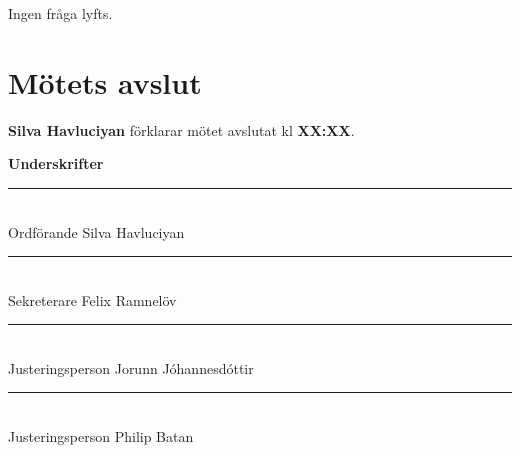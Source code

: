 \documentclass{datateknologsektionen-document}
\begin{document}
Ingen fråga lyfts.


\section{Mötets avslut}


\textbf{Silva Havluciyan} förklarar mötet avslutat kl \textbf{XX:XX}.




\pagebreak
{\Large\bfseries Underskrifter}

\vspace*{1.2cm}
\noindent\rule{8cm}{1pt}\\
Ordförande Silva Havluciyan

\vspace*{1.2cm}
\noindent\rule{8cm}{1pt}\\
Sekreterare Felix Ramnelöv

\vspace*{1.2cm}
\noindent\rule{8cm}{1pt}\\
Justeringsperson Jorunn Jóhannesdóttir

\vspace*{1.2cm}
\noindent\rule{8cm}{1pt}\\
Justeringsperson Philip Batan
\end{document}

